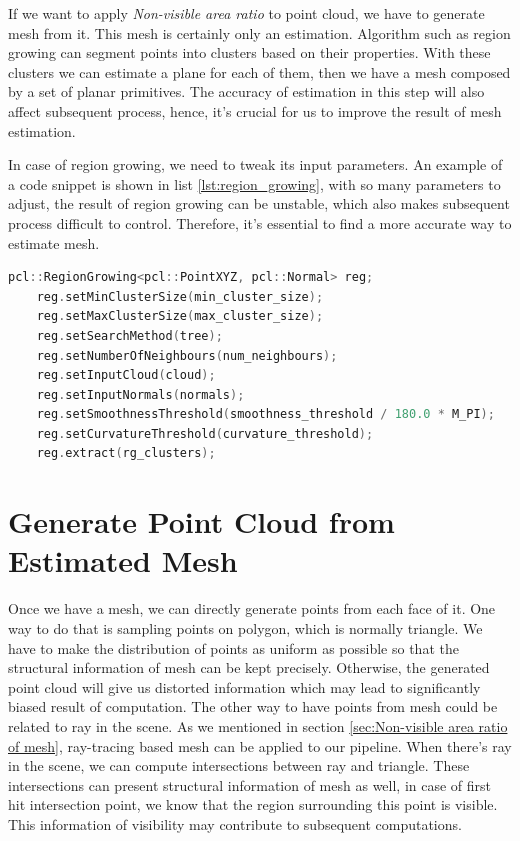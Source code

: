 \documentclass[11pt, a4paper,oneside,chapterprefix=false]{scrbook}
\begin{document}
If we want to apply \textit{Non-visible area ratio} to point cloud, we have to generate mesh from it. This mesh is certainly only an estimation. Algorithm such as region growing can segment points into clusters based on their properties. With these clusters we can estimate a plane for each of them, then we have a mesh composed by a set of planar primitives. The accuracy of estimation in this step will also affect subsequent process, hence, it's crucial for us to improve the result of mesh estimation. 

\vspace{10pt}

In case of region growing, we need to tweak its input parameters. An example of a code snippet is shown in list \ref{lst:region_growing}, with so many parameters to adjust, the result of region growing can be unstable, which also makes subsequent process difficult to control. Therefore, it's essential to find a more accurate way to estimate mesh.   
\begin{lstlisting}[language=C++, caption=region growing, label=lst:region_growing]
    pcl::RegionGrowing<pcl::PointXYZ, pcl::Normal> reg;
    reg.setMinClusterSize(min_cluster_size);
    reg.setMaxClusterSize(max_cluster_size);
    reg.setSearchMethod(tree);
    reg.setNumberOfNeighbours(num_neighbours);
    reg.setInputCloud(cloud);
    reg.setInputNormals(normals);
    reg.setSmoothnessThreshold(smoothness_threshold / 180.0 * M_PI);
    reg.setCurvatureThreshold(curvature_threshold);
    reg.extract(rg_clusters);
\end{lstlisting}

\section{Generate Point Cloud from Estimated Mesh} \label{generate point cloud from estimated mesh}

Once we have a mesh, we can directly generate points from each face of it. One way to do that is sampling points on polygon, which is normally triangle. We have to make the distribution of points as uniform as possible so that the structural information of mesh can be kept precisely. Otherwise, the generated point cloud will give us distorted information which may lead to significantly biased result of computation. The other way to have points from mesh could be related to ray in the scene. As we mentioned in section \ref{sec:Non-visible area ratio of mesh}, ray-tracing based mesh can be applied to our pipeline. When there's ray in the scene, we can compute intersections between ray and triangle. These intersections can present structural information of mesh as well, in case of first hit intersection point, we know that the region surrounding this point is visible. This information of visibility may contribute to subsequent computations. 
\end{document}
